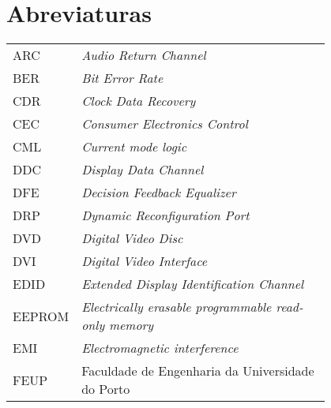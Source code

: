 \chapter*{Abreviaturas}

\begin{flushleft}
\begin{longtable}{l p{0.8\linewidth}}
ARC       		& 	\textit{Audio Return Channel}                                                                         \\
BER       		& 	\textit{Bit Error Rate}                                                                               \\
CDR       		& 	\textit{Clock Data Recovery}                                                                          \\
CEC       		& 	\textit{Consumer Electronics Control}                                                                 \\
CML       		& 	\textit{Current mode logic}                                                                                      \\
DDC       		& \textit{Display Data Channel}                                                                         \\
DFE       		& \textit{Decision Feedback Equalizer}                                                                  \\
DRP       		& \textit{Dynamic Reconfiguration Port}                                                                            \\
DVD       		& \textit{Digital Video Disc}                                                                                   \\
DVI       		& \textit{Digital Video Interface}                                                                      \\
EDID      		& \textit{Extended Display Identification Channel}                                                      \\
EEPROM    & \textit{Electrically erasable programmable read-only memory}                                          \\
EMI       		& \textit{Electromagnetic interference}                                                                         \\
FEUP      	& Faculdade de Engenharia da Universidade do Porto                                                        \\

\end{longtable}
\end{flushleft}
